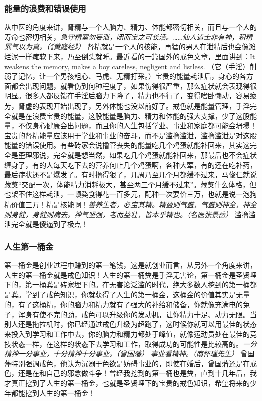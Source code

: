 \subsubsection{能量的浪费和错误使用}

从中医的角度来讲，肾精与一个人脑力、精力、体能都密切相关，而且与一个人的寿命也密切相关，\textit{急守精室勿妄泄，闭而宝之可长活。……仙人道士非有神，积精累气以为真。（《黄庭经》）} 肾精就是一个人的核能，再猛的男人在泄精后也会像滩烂泥一样瘫软下来，乃至倒头就睡。最近看的一篇国外的戒色文章，里面讲到：It weakens the memory, makes a boy careless, negligent and listless. （它（手淫）削弱了记忆，让一个男孩粗心、马虎、无精打采。）宝贵的能量耗泄后，身心的各方面都会出现问题，就看伤到何种程度了，如果伤得很严重，那么症状就会表现得很明显。很多人都反馈在手淫后脑力下降了，精力也不行了，变得嗜卧懒动，容易疲劳，肾虚的表现开始出现了，另外体能也没以前好了。戒色就是能量管理，手淫完全就是在浪费宝贵的能量，这股能量是脑力、精力和体能的强大支撑，少了这股能量，不仅身心健康会出问题，而且你的人生包括学业、事业和家庭都可能会坍塌！宝贵的肾精能量应该用于学业和事业的奋斗，而不是滥撸滥泄，滥撸滥泄是对这股能量的错误使用。有些砖家会说撸管丧失的能量吃几个鸡蛋就能补回来，其实这完全是歪理邪说，完全就是想当然，如果吃几个鸡蛋就能补回来，那最后也不会症状缠身了，有的人每天吃下去的营养何止几个鸡蛋啊，各种大荤，有的还在吃补药，最后症状还不是爆发了。有时撸得狠了，几周乃至几个月都缓不过来，马俊仁就说藏獒“交配一次，体能精力消耗极大，甚至两三个月缓不过来”。藏獒什么体格，但也架不住这样耗泄，一顿獒食得花一百多元，配种一次要价三万，也就是说一泡狗精价值三万！精是核能啊！\textit{善养生者，必宝其精。精盈则气盛，气盛则神全，神全则身健，身健则病去。神气坚强，老而益壮，皆本乎精也。（名医张景岳）} 滥撸滥泄完全就是傻逼到了极点！

\subsubsection{人生第一桶金}

第一桶金是创业过程中赚到的第一笔钱，这是就创业而言，从另外一个角度来讲，人生的第一桶金就是戒色知识！人生的第一桶粪是手淫无害论，第一桶金是圣贤埋下的，第一桶粪是砖家埋下的。在无害论泛滥的时代，绝大多数人挖到的第一桶都是粪。学到了戒色知识，你就获得了人生的第一桶金，这桶金的价值其实是无量的，有了这桶精，你的脑力和精力就有了强大的补给和储备，你就像充满电的兔子，浑身有使不完的劲，戒色可以升级你的发动机，让你精力十足、动力无限。当别人还是拖拉机时，你已经通过戒色升级为超跑了，这时候你就可以用最佳的状态来投入到学习和工作中去，你的脑力和精力都处于峰值，就像运动员处在最佳的竞技状态一样，在这样的状态下去学习和工作，取得成功的可能性是比较高的。\textit{一分精神一分事业，十分精神十分事业。（曾国藩）} \textit{事业看精神。（南怀瑾先生）} 曾国藩特别强调戒色，他认为沉溺于色欲是妨碍事业的，即使在婚后，曾国藩还是在戒色，还是在和自己的邪念做斗争！曾经我挖到的第一桶也是粪，直到十几年后，我才真正挖到了人生的第一桶金，也就是圣贤埋下的宝贵的戒色知识，希望将来的少年都能挖到人生的第一桶金！

